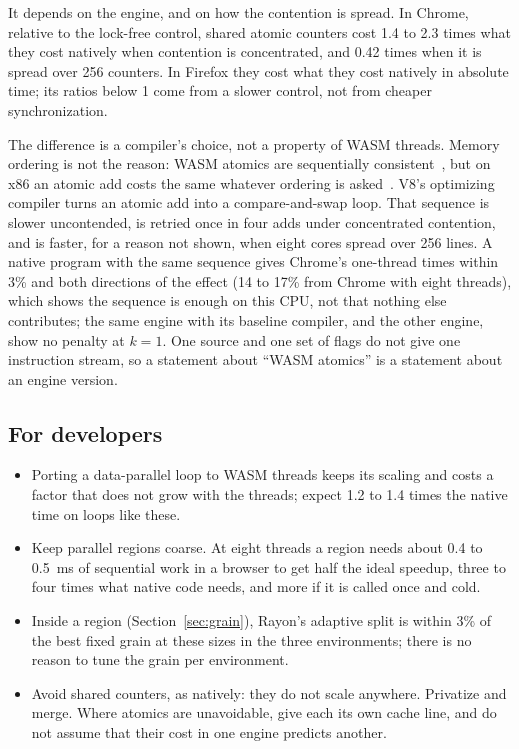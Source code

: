It depends on the engine, and on how the contention is spread. In Chrome,
relative to the lock-free control, shared atomic counters cost 1.4 to 2.3
times what they cost natively when contention is concentrated, and 0.42
times when it is spread over 256 counters. In Firefox they cost what they
cost natively in absolute time; its ratios below 1 come from a slower
control, not from cheaper synchronization.

The difference is a compiler's choice, not a property of WASM threads.
Memory ordering is not the reason: WASM atomics are sequentially
consistent~\cite{watt2019}, but on x86 an atomic add costs the same
whatever ordering is asked~\cite{schweizer2015}. V8's optimizing compiler
turns an atomic add into a compare-and-swap loop.
That sequence is slower uncontended, is retried once in four adds under
concentrated contention, and is faster, for a reason not shown, when eight
cores spread over 256 lines. A native program with the same sequence gives
Chrome's one-thread times within 3\% and both directions of the effect
(14 to 17\% from Chrome with eight threads), which shows the sequence is
enough on this CPU, not that nothing else contributes; the same engine with its baseline compiler, and the other
engine, show no penalty at $k=1$. One source and one set of flags do not
give one instruction stream, so a statement about ``WASM atomics'' is a
statement about an engine version.

\subsection{For developers}

\begin{itemize}[leftmargin=1.5em]
\item Porting a data-parallel loop to WASM threads keeps its scaling and
costs a factor that does not grow with the threads; expect 1.2 to 1.4 times the native time on loops
like these.
\item Keep parallel regions coarse. At eight threads a region needs about
0.4 to 0.5~ms of sequential work in a browser to get half the ideal
speedup, three to four times what native code needs, and more if it is
called once and cold.
\item Inside a region (Section~\ref{sec:grain}), Rayon's adaptive split is within 3\% of the best
fixed grain at these sizes in the three environments; there is no reason
to tune the grain per environment.
\item Avoid shared counters, as natively: they do not scale anywhere.
Privatize and merge. Where atomics are unavoidable, give each its own cache
line, and do not assume that their cost in one engine predicts another.
\end{itemize}

